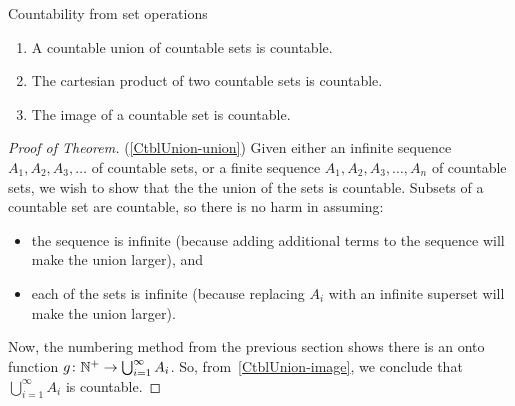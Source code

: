 \documentclass[../MATH-2000-Notes.tex]{subfiles}
\begin{document}
\begin{Theorem}
    {Countability from set operations}
    \label{CtblUnion} \
    \begin{enumerate}
        \item  \label{CtblUnion-union}
              A countable union of countable sets is countable.
        \item  \label{CtblUnion-product}
              The cartesian product of two countable sets is countable.
        \item  \label{CtblUnion-image}
              The image of a countable set is countable.
    \end{enumerate}
\end{Theorem}
\begin{proof}[Proof of Theorem] %
    (\ref{CtblUnion-union}) Given either an infinite sequence $A_1,A_2,A_3,\ldots$ of countable sets, or a finite sequence $A_1,A_2,A_3,\ldots,A_n$ of countable sets, we wish to show that the the union of the sets is countable. Subsets of a countable set are countable, so there is no harm in assuming:
    \begin{itemize}
        \item the sequence is infinite (because adding additional terms to the sequence will make the union larger),
              and
        \item each of the sets is infinite (because replacing $A_i$ with an infinite superset will make the union larger).
    \end{itemize}
    Now, the numbering method from the previous section shows there is an onto function $g \colon \mathbb{N}^+ \to \bigcup_{i=1}^\infty A_i$. So, from~\ref{CtblUnion-image}, we conclude that $\bigcup_{i=1}^\infty A_i$ is countable.

    \medskip


\end{proof}
\end{document}
